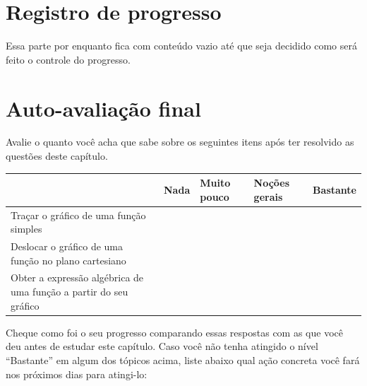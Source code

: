 \documentclass[main.tex]{subfiles}
\begin{document}
\section{Registro de progresso}

Essa parte por enquanto fica com conteúdo vazio até que seja decidido como será feito o controle do progresso.

\section{Auto-avaliação final}
Avalie o quanto você acha que sabe sobre os seguintes itens após ter resolvido as questões deste capítulo.

\begin{center}
 \begin{tabular}{|p{35mm}||p{15mm}|p{15mm}|p{15mm}|p{15mm}|} 
 \hline
   & Nada & Muito pouco & Noções gerais & Bastante\\
 \hline
 Traçar o gráfico de uma função simples &  &  &  &  \\ 
 \hline
 Deslocar o gráfico de uma função no plano cartesiano &  &  &  &  \\
 \hline
 Obter a expressão algébrica de uma função a partir do seu gráfico &  &  &  &  \\
 \hline
\end{tabular}
\end{center}

Cheque como foi o seu progresso comparando essas respostas com as que você deu antes de estudar este capítulo. Caso você não tenha atingido o nível ``Bastante''  em algum dos tópicos acima, liste abaixo qual ação concreta você fará nos próximos dias para atingi-lo:

\paraAmbos
\end{document}
